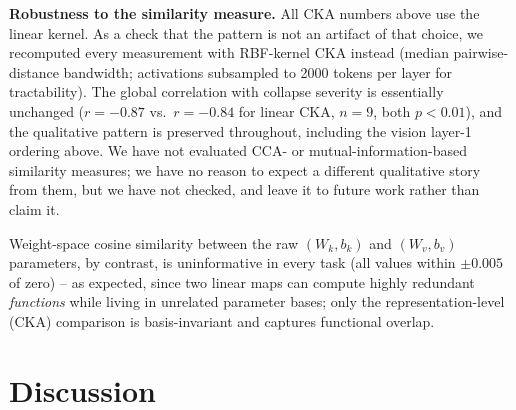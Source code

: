 \documentclass[11pt]{article}
\begin{document}
\textbf{Robustness to the similarity measure.} All CKA numbers above use the linear
kernel. As a check that the pattern is not an artifact of that choice, we recomputed
every measurement with RBF-kernel CKA \cite{kornblith2019similarity} instead (median
pairwise-distance bandwidth; activations subsampled to 2000 tokens per layer for
tractability). The global correlation with collapse severity is essentially unchanged
($r=-0.87$ vs.\ $r=-0.84$ for linear CKA, $n=9$, both $p<0.01$), and the qualitative
pattern is preserved throughout, including the vision layer-1 ordering above. We have
not evaluated CCA- or mutual-information-based similarity measures; we have no reason
to expect a different qualitative story from them, but we have not checked, and leave
it to future work rather than claim it.

Weight-space cosine similarity between the raw $(W_k, b_k)$ and $(W_v, b_v)$
parameters, by contrast, is uninformative in every task (all values within $\pm 0.005$
of zero) -- as expected, since two linear maps can compute highly redundant
\emph{functions} while living in unrelated parameter bases; only the
representation-level (CKA) comparison is basis-invariant and captures functional
overlap.

\section{Discussion}
\label{sec:discussion}
\end{document}
